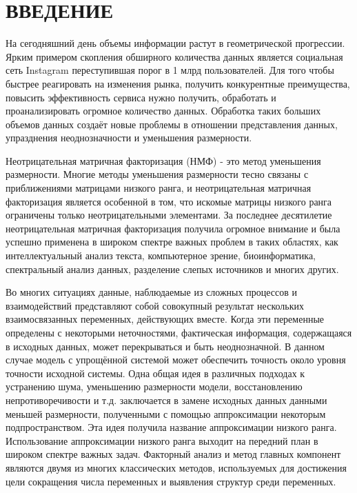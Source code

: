 

\chapter*{ВВЕДЕНИЕ}

На сегодняшний день объемы информации растут в геометрической прогрессии.
Ярким примером  скопления обширного количества данных является социальная сеть Instagram переступившая порог в 1 млрд пользователей.
Для того чтобы быстрее реагировать на изменения рынка, получить конкурентные преимущества,
повысить эффективность сервиса нужно получить, обработать и проанализировать огромное количество данных.
Обработка таких больших объемов данных создаёт новые проблемы в отношении представления данных,
упразднения неоднозначности и уменьшения размерности.

Неотрицательная матричная факторизация (НМФ) - это метод уменьшения размерности.
Многие методы уменьшения размерности тесно связаны с приближениями матрицами низкого ранга,
и неотрицательная матричная факторизация является особенной в том,
что искомые матрицы низкого ранга ограничены только неотрицательными элементами.
За последнее десятилетие
неотрицательная матричная факторизация получила огромное внимание и была успешно применена в широком спектре
важных проблем в таких областях, как интеллектуальный анализ текста, компьютерное зрение,
биоинформатика, спектральный анализ данных, разделение слепых источников и многих других.

Во многих ситуациях данные, наблюдаемые из сложных процессов и взаимодействий
представляют собой совокупный результат нескольких взаимосвязанных переменных, действующих вместе.
Когда эти переменные определены с некоторыми неточностями, фактическая информация, содержащаяся в исходных данных,
может перекрываться и быть неоднозначной.
В данном случае модель с упрощённой системой может обеспечить точность около уровня точности исходной системы.
Одна общая идея в различных подходах к устранению шума, уменьшению размерности модели,
восстановлению непротиворечивости и т.д. заключается в замене исходных данных данными меньшей размерности,
полученными с помощью аппроксимации некоторым подпространством.
Эта идея получила название аппроксимации низкого ранга.
Использование аппроксимации низкого ранга выходит на передний план в широком спектре важных задач.
Факторный анализ и метод главных компонент являются двумя из многих классических методов,
используемых для достижения цели сокращения числа переменных и выявления структур среди переменных.

